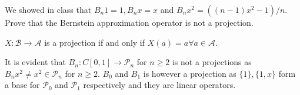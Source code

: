 \begin{problem}
  We showed in class that $B_n 1 = 1, B_n x = x $ and $B_n x^2 = ((n -
  1)x^2 - 1 ) /n$. Prove that the Bernstein approximation operator is
  not a projection.
\end{problem}

\begin{solution}
  $X: \mathcal{B} \rightarrow \mathcal{A}$ is a projection if and only
  if $X(a) = a \forall a \in \mathcal{A}$.

  It is evident that $B_n:C[0,1] \rightarrow \mathcal{P}_n$ for
  $n \geq 2$ is not a projections as
  $B_n x^2 \neq x^2 \in \mathcal{P}_n$ for $n \geq 2$. $B_0$ and $B_1$
  is however a projection as $\{1\}, \{1, x\}$ form a base for
  $\mathcal{P}_0$ and $\mathcal{P}_1$ respectively and they are
  linear operators.
\end{solution}

